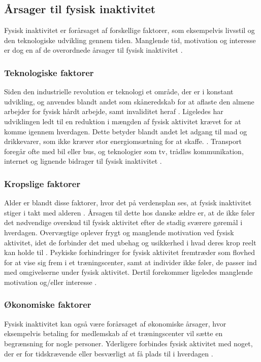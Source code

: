 \subsection{Årsager til fysisk inaktivitet}
Fysisk inaktivitet er forårsaget af forskellige faktorer, som eksempelvis livsstil og den teknologiske udvikling gennem tiden. Manglende tid, motivation og interesse er dog en af de overordnede årsager til fysisk inaktivitet \citep{ottesen2005}.  

\subsubsection{Teknologiske faktorer}  
Siden den industrielle revolution er teknologi et område, der er i konstant udvikling, og anvendes blandt andet som skåneredskab for at aflaste den almene arbejder for fysisk hårdt arbejde, samt invaliditet heraf \citep{hallal2012}. 
Ligeledes har udviklingen ledt til en reduktion i mængden af fysisk aktivitet krævet for at komme igennem hverdagen. Dette betyder blandt andet let adgang til mad og drikkevarer, som ikke kræver stor energiomsætning for at skaffe. \citep{hallal2012, motionsraad2007}.  Transport foregår ofte med bil eller bus, og teknologier som tv, trådløs kommunikation, internet og lignende bidrager til fysisk inaktivitet \citep{hallal2012}.  

\subsubsection{Kropslige faktorer}
Alder er blandt disse faktorer, hvor det på verdensplan ses, at fysisk inaktivitet stiger i takt med alderen \citep{guthold2008}. 
Årsagen til dette hos danske ældre er, at de ikke føler det nødvendige overskud til fysisk aktivitet efter de stadig sværere gøremål i hverdagen. 
Overvægtige oplever frygt og manglende motivation ved fysisk aktivitet, idet de forbinder det med ubehag og usikkerhed i hvad deres krop reelt kan holde til \citep{ottesen2005}. 
Psykiske forhindringer for fysisk aktivitet fremtræder som flovhed for at vise sig frem i et træningscenter, samt at individer ikke føler, de passer ind med omgivelserne under fysisk aktivitet. 
Dertil forekommer ligeledes manglende motivation og/eller interesse \citep{ottesen2005}.

\subsubsection{Økonomiske faktorer}
Fysisk inaktivitet kan også være forårsaget af økonomiske årsager, hvor eksempelvis betaling for medlemskab af et træningscenter vil sætte en begrænsning for nogle personer. Yderligere forbindes fysisk aktivitet med noget, der er for tidskrævende eller besværligt at få plads til i hverdagen \citep{ottesen2005}.